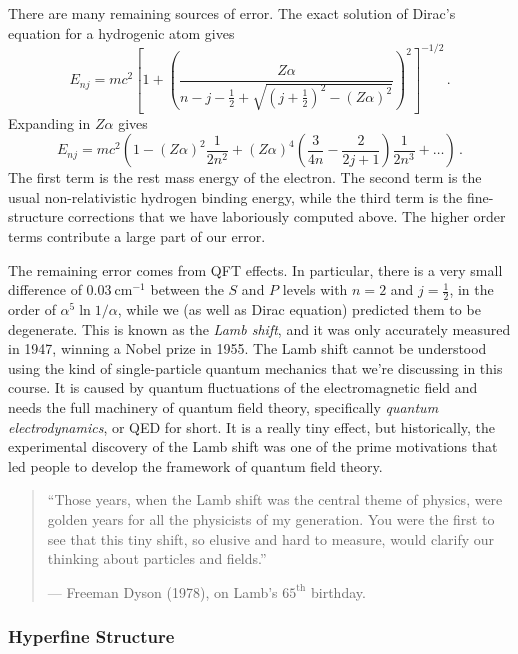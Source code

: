 \documentclass{article}
\theoremstyle{plain}\theoremheaderfont{\normalfont\itshape}\theorembodyfont{\rmfamily}\theoremseparator{.}\newtheorem*{rem}{Remark}\newtheorem*{ex}{Example}\newtheorem*{proof}{Proof}\newtheorem*{altp}{Alternative proof}
\theoremstyle{plain}\theoremheaderfont{\normalfont\bfseries}\theorembodyfont{\rmfamily}\theoremseparator{.}\newtheorem{thm}{Theorem}[section]\newtheorem{lem}[thm]{Lemma}\newtheorem{prop}[thm]{Proposition}\newtheorem*{cor}{Corollary}\newtheorem{defn}[thm]{Definition}\newtheorem{clm}[thm]{Claim}\newtheorem{clminproof}{Claim}
\theoremstyle{break}\theoremheaderfont{\normalfont\itshape}\theorembodyfont{\rmfamily}\theoremseparator{.\medskip}\newtheorem*{proofskip}{Proof}\newtheorem*{exs}{Examples}\newtheorem*{rems}{Remarks}
\theoremstyle{break}\theoremheaderfont{\normalfont\bfseries}\theorembodyfont{\rmfamily}\theoremseparator{.\medskip}\newtheorem{lemskip}[thm]{Lemma}\newtheorem{defnskip}[thm]{Definition}\newtheorem{propskip}[thm]{Proposition}\newtheorem{thmskip}[thm]{Theorem}
\numberwithin{equation}{section}
\newcommand{\unit}[1]{\ \mathrm{#1}}
\begin{document}
    There are many remaining sources of error. The exact solution of Dirac's equation for a hydrogenic atom gives
    \begin{equation}
        E_{nj}=mc^2\left[1+\left(\frac{Z\alpha}{n-j-\frac{1}{2}+\sqrt{(j+\frac{1}{2})^2-(Z\alpha)^2}}\right)^2\right]^{-1/2}\,.
    \end{equation}
    Expanding in \(Z\alpha\) gives
    \begin{equation}
        E_{nj}=mc^2\left(1-(Z\alpha)^2\frac{1}{2n^2}+(Z\alpha)^4\left(\frac{3}{4n}-\frac{2}{2j+1}\right)\frac{1}{2n^3}+\dots\right)\,.
    \end{equation}
    The first term is the rest mass energy of the electron. The second term is the usual non-relativistic hydrogen binding energy, while the third term is the fine-structure corrections that we have laboriously computed above. The higher order terms contribute a large part of our error.

    The remaining error comes from QFT effects. In particular, there is a very small difference of \(0.03\unit{cm}^{-1}\) between the \(S\) and \(P\) levels with \(n=2\) and \(j=\frac{1}{2}\), in the order of \(\alpha^5\ln 1/\alpha\), while we (as well as Dirac equation) predicted them to be degenerate. This is known as the \textit{Lamb shift}, and it was only accurately measured in 1947, winning a Nobel prize in 1955. The Lamb shift cannot be understood using the kind of single-particle quantum mechanics that we're discussing in this course. It is caused by quantum fluctuations of the electromagnetic field and needs the full machinery of quantum field theory, specifically \textit{quantum electrodynamics}, or QED for short. It is a really tiny effect, but historically, the experimental discovery of the Lamb shift was one of the prime motivations that led people to develop the framework of quantum field theory.

    \begin{quote}
        ``Those years, when the Lamb shift was the central theme of physics, were golden years for all the physicists of my generation. You were the first to see that this tiny shift, so elusive and hard to measure, would clarify our thinking about particles and fields.''

        \hfill --- Freeman Dyson (1978), on Lamb's \(65^{\text{th}}\) birthday.
    \end{quote}

    \subsubsection{Hyperfine Structure}
\end{document}
